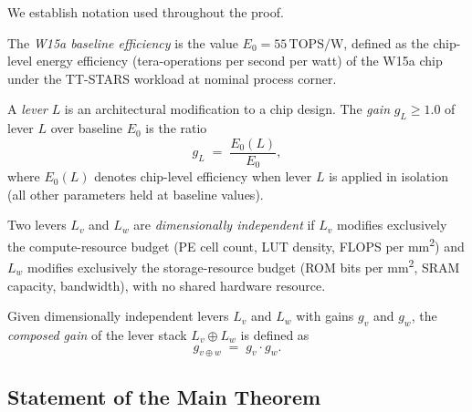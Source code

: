 We establish notation used throughout the proof.

\begin{definition}
  \label{def:baseline}
  The \emph{W15a baseline efficiency} is the value
  $E_0 = 55\,\text{TOPS/W}$,
  defined as the chip-level energy efficiency (tera-operations per second per watt)
  of the W15a chip under the TT-STARS workload at nominal process corner.
\end{definition}

\begin{definition}
  \label{def:lever-gain}
  A \emph{lever} $L$ is an architectural modification to a chip design.
  The \emph{gain} $g_L \geq 1.0$ of lever $L$ over baseline $E_0$ is the ratio
  \begin{equation}
    g_L \;=\; \frac{E_{0}(L)}{E_0},
    \label{eq:lever-gain}
  \end{equation}
  where $E_{0}(L)$ denotes chip-level efficiency when lever $L$ is applied
  in isolation (all other parameters held at baseline values).
\end{definition}

\begin{definition}
  \label{def:dim-indep}
  Two levers $L_v$ and $L_w$ are \emph{dimensionally independent} if
  $L_v$ modifies exclusively the compute-resource budget
  (PE cell count, LUT density, FLOPS per mm\textsuperscript{2})
  and $L_w$ modifies exclusively the storage-resource budget
  (ROM bits per mm\textsuperscript{2}, SRAM capacity, bandwidth),
  with no shared hardware resource.
\end{definition}

\begin{definition}
  \label{def:composed-gain}
  Given dimensionally independent levers $L_v$ and $L_w$ with gains
  $g_v$ and $g_w$, the \emph{composed gain} of the lever stack
  $L_v \oplus L_w$ is defined as
  \begin{equation}
    g_{v \oplus w} \;=\; g_v \cdot g_w.
    \label{eq:composed-gain}
  \end{equation}
\end{definition}

\subsection{Statement of the Main Theorem}

